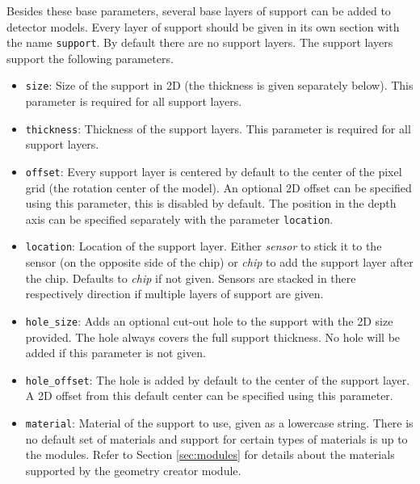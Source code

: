 Besides these base parameters, several base layers of support can be added to detector models. Every layer of support should be given in its own section with the name \texttt{support}. By default there are no support layers. The support layers support the following parameters.
\begin{itemize}
\item \texttt{size}: Size of the support in 2D (the thickness is given separately below). This parameter is required for all support layers.
\item \texttt{thickness}: Thickness of the support layers. This parameter is required for all support layers.
\item \texttt{offset}: Every support layer is centered by default to the center of the pixel grid (the rotation center of the model). An optional 2D offset can be specified using this parameter, this is disabled by default. The position in the depth axis can be specified separately with the parameter \texttt{location}.
\item \texttt{location}: Location of the support layer. Either \textit{sensor} to stick it to the sensor (on the opposite side of the chip) or \textit{chip} to add the support layer after the chip. Defaults to \textit{chip} if not given. Sensors are stacked in there respectively direction if multiple layers of support are given.
\item \texttt{hole\_size}: Adds an optional cut-out hole to the support with the 2D size provided. The hole always covers the full support thickness. No hole will be added if this parameter is not given.
\item \texttt{hole\_offset}: The hole is added by default to the center of the support layer. A 2D offset from this default center can be specified using this parameter.
\item \texttt{material}: Material of the support to use, given as a lowercase string. There is no default set of materials and support for certain types of materials is up to the modules. Refer to Section \ref{sec:modules} for details about the materials supported by the geometry creator module. 
\end{itemize}

